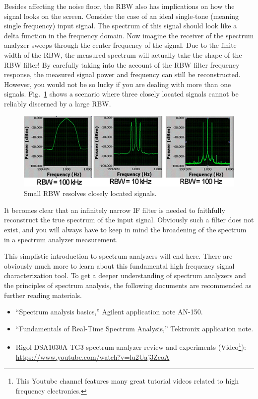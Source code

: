 \documentclass[letterpaper, 11pt]{article}
\begin{document}
Besides affecting the noise floor, the RBW also has implications on how the signal looks on the screen. Consider the case of an ideal single-tone (meaning single frequency) input signal. The spectrum of this signal should look like a delta function in the frequency domain. Now imagine the receiver of the spectrum analyzer sweeps through the center frequency of the signal. Due to the finite width of the RBW, the measured spectrum will actually take the shape of the RBW filter! By carefully taking into the account of the RBW filter frequency response, the measured signal power and frequency can still be reconstructed. However, you would not be so lucky if you are dealing with more than one signals. Fig.~\ref{fig:sa-rbw} shows a scenario where three closely located signals cannot be reliably discerned by a large RBW. 

\begin{figure}[h]
	\centering
	\includegraphics[width=4.5in]{sa-rbw}
	\caption{Small RBW resolves closely located signals.}
	\label{fig:sa-rbw}
\end{figure}

It becomes clear that an infinitely narrow IF filter is needed to faithfully reconstruct the true spectrum of the input signal. Obviously such a filter does not exist, and you will always have to keep in mind the broadening of the spectrum in a spectrum analyzer measurement. 

This simplistic introduction to spectrum analyzers will end here. There are obviously much more to learn about this fundamental high frequency signal characterization tool. To get a deeper understanding of spectrum analyzers and the principles of spectrum analysis, the following documents are recommended as further reading materials. 

\begin{itemize}[itemsep=0.1ex]
	\item ``Spectrum analysis basics,'' Agilent application note AN-150.
	\item ``Fundamentals of Real-Time Spectrum Analysis,'' Tektronix application note.
	\item Rigol DSA1030A-TG3 spectrum analyzer review and experiments (Video\footnote{This Youtube channel features many great tutorial videos related to high frequency electronics.}):\\  \url{https://www.youtube.com/watch?v=lu2Uaj3ZcoA }
\end{itemize}
\end{document}
